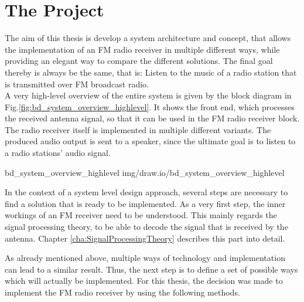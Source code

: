 \section{The Project}

The aim of this thesis is develop a system architecture and concept, that allows the implementation of an FM radio receiver in multiple different ways, while providing an elegant way to compare the different solutions.
The final goal thereby is always be the same, that is: Listen to the music of a radio station that is transmitted over FM broadcast radio.\\

\noindent
A very high-level overview of the entire system is given by the block diagram in Fig.\ref{fig:bd_system_overview_highlevel}.
It shows the front end, which processes the received antenna signal, so that it can be used in the FM radio receiver block.
The radio receiver itself is implemented in multiple different variants.
The produced audio output is sent to a speaker, since the ultimate goal is to listen to a radio stations' audio signal.

 {bd_system_overview_highlevel} {img/draw.io/bd_system_overview_highlevel}

In the context of a system level design approach, several steps are necessary to find a solution that is ready to be implemented.
As a very first step, the inner workings of an FM receiver need to be understood.
This mainly regards the signal processing theory, to be able to decode the signal that is received by the antenna.
Chapter \ref{cha:SignalProcessingTheory} describes this part into detail.

As already mentioned above, multiple ways of technology and implementation can lead to a similar result.
Thus, the next step is to define a set of possible ways which will actually be implemented.
For this thesis, the decision was made to implement the FM radio receiver by using the following methods.

